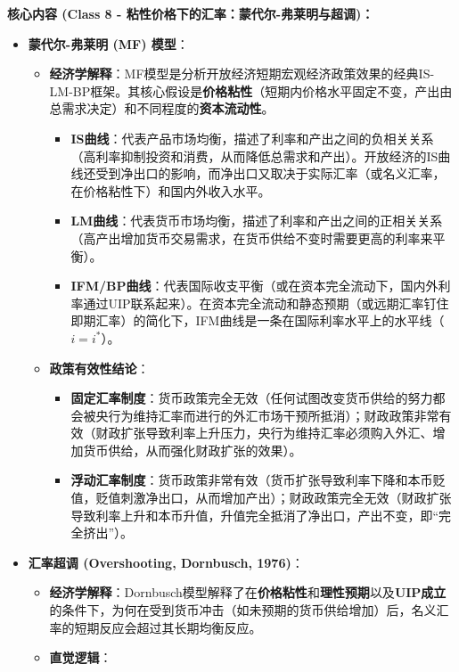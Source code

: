 \documentclass[12pt]{article}
\begin{document}
\textbf{核心内容 (Class 8 - 粘性价格下的汇率：蒙代尔-弗莱明与超调)：}
\begin{itemize}
    \item \textbf{蒙代尔-弗莱明 (MF) 模型}：
    \begin{itemize}
        \item \textbf{经济学解释}：MF模型是分析开放经济短期宏观经济政策效果的经典IS-LM-BP框架。其核心假设是\textbf{价格粘性}（短期内价格水平固定不变，产出由总需求决定）和不同程度的\textbf{资本流动性}。
        \begin{itemize}
            \item \textbf{IS曲线}：代表产品市场均衡，描述了利率和产出之间的负相关关系（高利率抑制投资和消费，从而降低总需求和产出）。开放经济的IS曲线还受到净出口的影响，而净出口又取决于实际汇率（或名义汇率，在价格粘性下）和国内外收入水平。
            \item \textbf{LM曲线}：代表货币市场均衡，描述了利率和产出之间的正相关关系（高产出增加货币交易需求，在货币供给不变时需要更高的利率来平衡）。
            \item \textbf{IFM/BP曲线}：代表国际收支平衡（或在资本完全流动下，国内外利率通过UIP联系起来）。在资本完全流动和静态预期（或远期汇率钉住即期汇率）的简化下，IFM曲线是一条在国际利率水平上的水平线（$i=i^*$）。
        \end{itemize}
        \item \textbf{政策有效性结论}：
        \begin{itemize}
            \item \textbf{固定汇率制度}：货币政策完全无效（任何试图改变货币供给的努力都会被央行为维持汇率而进行的外汇市场干预所抵消）；财政政策非常有效（财政扩张导致利率上升压力，央行为维持汇率必须购入外汇、增加货币供给，从而强化财政扩张的效果）。
            \item \textbf{浮动汇率制度}：货币政策非常有效（货币扩张导致利率下降和本币贬值，贬值刺激净出口，从而增加产出）；财政政策完全无效（财政扩张导致利率上升和本币升值，升值完全抵消了净出口，产出不变，即“完全挤出”）。
        \end{itemize}
    \end{itemize}
    \item \textbf{汇率超调 (Overshooting, Dornbusch, 1976)}：
    \begin{itemize}
        \item \textbf{经济学解释}：Dornbusch模型解释了在\textbf{价格粘性}和\textbf{理性预期}以及\textbf{UIP成立}的条件下，为何在受到货币冲击（如未预期的货币供给增加）后，名义汇率的短期反应会超过其长期均衡反应。
        \item \textbf{直觉逻辑}：

\end{itemize}
\end{itemize}
\end{document}
